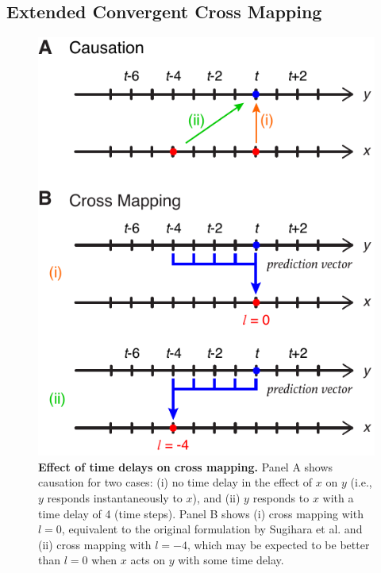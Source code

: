 \subsection{Extended Convergent Cross Mapping}

\begin{figure}[!ht]
\begin{center}\includegraphics[width=\maxwidth{\textwidth}]{fig_lag_extended_ccm.pdf}\end{center}
\caption[Effect of time delays on cross mapping.]{\textbf{Effect of time delays on cross mapping.}\newline
Panel A shows causation for two cases: (i) no time delay in the effect of $x$ on $y$ (i.e., $y$ responds instantaneously to $x$), and (ii) $y$ responds to $x$ with a time delay of 4 (time steps). Panel B shows (i) cross mapping with $l = 0$, equivalent to the original formulation by Sugihara et al. \cite{Sugihara_2012} and (ii) cross mapping with $l = -4$, which may be expected to be better than $l = 0$ when $x$ acts on $y$ with some time delay.}
\label{fig_lag_real_examples}
\end{figure}


